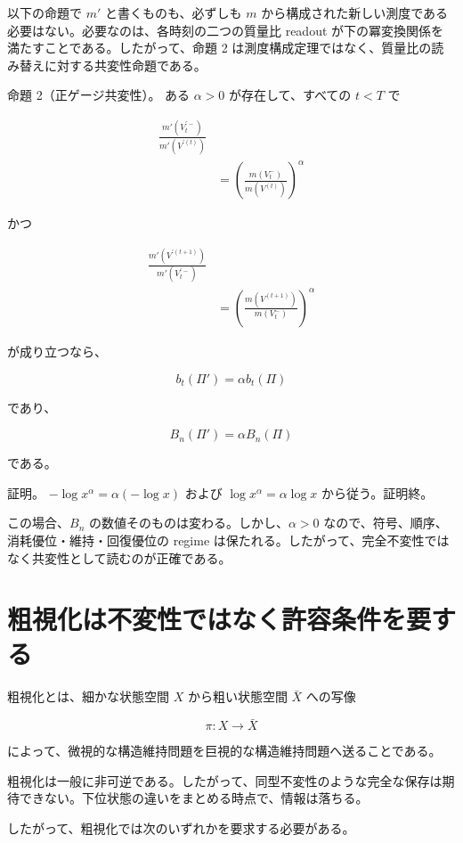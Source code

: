 \documentclass[12pt,a4paper]{article}
\begin{document}
以下の命題で \(m'\) と書くものも、必ずしも \(m\) から構成された新しい測度である必要はない。必要なのは、各時刻の二つの質量比 readout が下の冪変換関係を満たすことである。したがって、命題 2 は測度構成定理ではなく、質量比の読み替えに対する共変性命題である。

命題 2（正ゲージ共変性）。 ある \(\alpha>0\) が存在して、すべての \(t<T\) で

\[
\begin{aligned}
\frac{m'(V_{t}^{\prime -})}{m'(V^{\prime(t)})} \\
&= \left(\frac{m(V_{t}^-)}{m(V^{(t)})}\right)^\alpha
\end{aligned}
\]

かつ

\[
\begin{aligned}
\frac{m'(V^{\prime(t+1)})}{m'(V_{t}^{\prime -})} \\
&= \left(\frac{m(V^{(t+1)})}{m(V_{t}^-)}\right)^\alpha
\end{aligned}
\]

が成り立つなら、

\[
b_{t}(\Pi')=\alpha b_{t}(\Pi)
\]

であり、

\[
B_{n}(\Pi')=\alpha B_{n}(\Pi)
\]

である。

証明。 \(-\log x^\alpha=\alpha(-\log x)\) および \(\log x^\alpha=\alpha \log x\) から従う。証明終。

この場合、\(B_{n}\) の数値そのものは変わる。しかし、\(\alpha>0\) なので、符号、順序、消耗優位・維持・回復優位の regime は保たれる。したがって、完全不変性ではなく共変性として読むのが正確である。

\section{粗視化は不変性ではなく許容条件を要する}\label{ux7c97ux8996ux5316ux306fux4e0dux5909ux6027ux3067ux306fux306aux304fux8a31ux5bb9ux6761ux4ef6ux3092ux8981ux3059ux308b}

粗視化とは、細かな状態空間 \(X\) から粗い状態空間 \(\bar X\) への写像

\[
\pi:X\to\bar X
\]

によって、微視的な構造維持問題を巨視的な構造維持問題へ送ることである。

粗視化は一般に非可逆である。したがって、同型不変性のような完全な保存は期待できない。下位状態の違いをまとめる時点で、情報は落ちる。

したがって、粗視化では次のいずれかを要求する必要がある。
\end{document}
